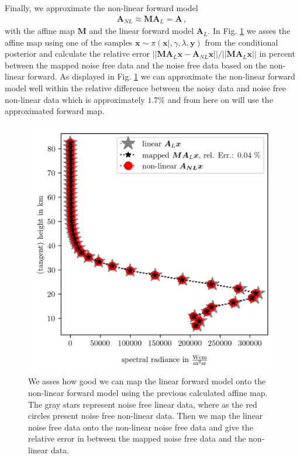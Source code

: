 Finally, we approximate the non-linear forward model
\begin{align}
	\bm{A}_{NL} \approx \bm{M A}_L = \bm{A} \, ,
\end{align}
with the affine map $\bm{M}$ and the linear forward model $\bm{A}_L$.
In Fig. \ref{fig:MapAsses} we asses the affine map using one of the samples $\bm{x} \sim \pi(\bm{x}|, \gamma, \lambda, \bm{y}) $ from the conditional posterior and calculate the relative error $|| \bm{M}\bm{A}_L \bm{x} - \bm{A}_{NL} \bm{x} || / || \bm{M}\bm{A}_L \bm{x} ||$ in percent between the mapped noise free data and the noise free data based on the non-linear forward.
As displayed in Fig. \ref{fig:MapAsses} we can approximate the non-linear forward model well within the relative difference between the noisy data and noise free non-linear data which is approximately $ 1.7 \%$ and from here on will use the approximated forward map.
\begin{figure}[ht!]
	\centering
	\includegraphics{SampMapAssesmentTT.png}
	\caption[Assessment of affine map.]{We asses how good we can map the linear forward model onto the non-linear forward model using the previous calculated affine map. The gray stars represent noise free linear data, where as the red circles present noise free non-linear data. Then we map the linear noise free data onto the non-linear noise free data and give the relative error in between the mapped noise free data and the non-linear data.}
	\label{fig:MapAsses}
\end{figure}


